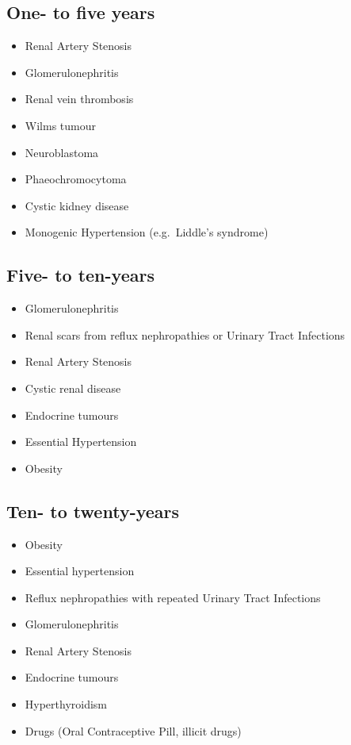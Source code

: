 \documentclass[
  letterpaper,
  DIV=11,
  numbers=noendperiod]{scrreprt}
\providecommand{\tightlist}{%
  \setlength{\itemsep}{0pt}\setlength{\parskip}{0pt}}\usepackage{longtable,booktabs,array}
\begin{document}
\hypertarget{one--to-five-years}{%
\subsection{One- to five years}\label{one--to-five-years}}

\begin{itemize}
\tightlist
\item
  Renal Artery Stenosis
\item
  Glomerulonephritis
\item
  Renal vein thrombosis
\item
  Wilms tumour
\item
  Neuroblastoma
\item
  Phaeochromocytoma
\item
  Cystic kidney disease
\item
  Monogenic Hypertension (e.g.~Liddle's syndrome)
\end{itemize}

\hypertarget{five--to-ten-years}{%
\subsection{Five- to ten-years}\label{five--to-ten-years}}

\begin{itemize}
\tightlist
\item
  Glomerulonephritis
\item
  Renal scars from reflux nephropathies or Urinary Tract Infections
\item
  Renal Artery Stenosis
\item
  Cystic renal disease
\item
  Endocrine tumours
\item
  Essential Hypertension
\item
  Obesity
\end{itemize}

\hypertarget{ten--to-twenty-years}{%
\subsection{Ten- to twenty-years}\label{ten--to-twenty-years}}

\begin{itemize}
\tightlist
\item
  Obesity
\item
  Essential hypertension
\item
  Reflux nephropathies with repeated Urinary Tract Infections
\item
  Glomerulonephritis
\item
  Renal Artery Stenosis
\item
  Endocrine tumours
\item
  Hyperthyroidism
\item
  Drugs (Oral Contraceptive Pill, illicit drugs)
\end{itemize}
\end{document}
